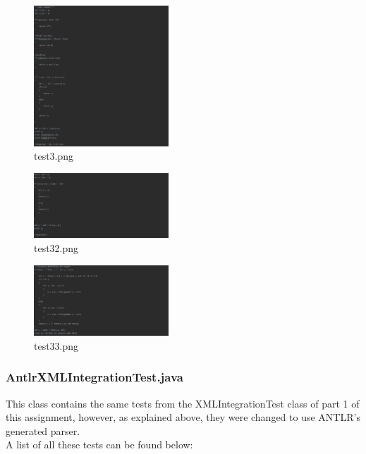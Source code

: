 \documentclass{article}
\begin{document}
\begin{multicols}{2}
					\begin{figure}[H]
					\centering
			 			\includegraphics[width=0.45\textwidth]{test3.png}
			 			\centering
			  			\caption{test3.png}
			  			\label{fig:test3}
					\end{figure}

					

					\begin{figure}[H]
					\centering
			 			\includegraphics[width=0.45\textwidth]{test32.png}
			 			\centering
			  			\caption{test32.png}
			  			\label{fig:test32}
					\end{figure}
					
										\begin{figure}[H]
					\centering
			 			\includegraphics[width=0.45\textwidth]{test33.png}
			 			\centering
			  			\caption{test33.png}
			  			\label{fig:test33}
					\end{figure}					
			\end{multicols}
			
			\subsubsection{AntlrXMLIntegrationTest.java}
					
					This class contains the same tests from the XMLIntegrationTest class of part 1 of this assignment, however, as explained above, they were changed to use ANTLR's generated parser.\\A list of all these tests can be found below:
					
\end{document}
